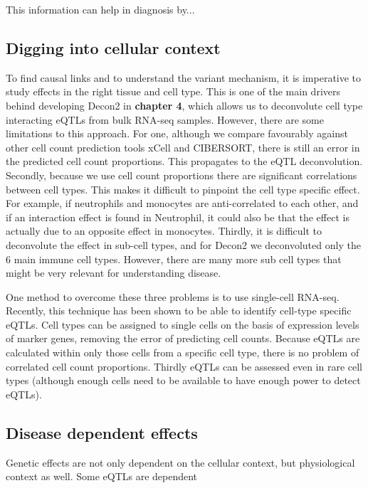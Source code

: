 This information can help in diagnosis by...


\subsection{Digging into cellular context}
To find causal links and to understand the variant mechanism, it is imperative to study effects in the right tissue and cell type. This is one of the main drivers behind developing Decon2 in \textbf{chapter 4}, which allows us to deconvolute cell type interacting eQTLs from bulk RNA-seq samples. However, there are some limitations to this approach. For one, although we compare favourably against other cell count prediction tools xCell\cite{aranXCellDigitallyPortraying2017} and CIBERSORT\cite{newmanRobustEnumerationCell2015}, there is still an error in the predicted cell count proportions. This propagates to the eQTL deconvolution. Secondly, because we use cell count proportions there are significant correlations between cell types. This makes it difficult to pinpoint the cell type specific effect. For example, if neutrophils and monocytes are anti-correlated to each other, and if an interaction effect is found in Neutrophil, it could also be that the effect is actually due to an opposite effect in monocytes. Thirdly, it is difficult to deconvolute the effect in sub-cell types, and for Decon2 we deconvoluted only the 6 main immune cell types. However, there are many more sub cell types that might be very relevant for understanding disease.

One method to overcome these three problems is to use single-cell RNA-seq\cite{tangMRNASeqWholetranscriptomeAnalysis2009}. Recently, this technique has been shown to be able to identify cell-type specific eQTLs\cite{vanderwijstSinglecellRNASequencing2018b}. Cell types can be assigned to single cells on the basis of expression levels of marker genes, removing the error of predicting cell counts. Because eQTLs are calculated within only those cells from a specific cell type, there is no problem of correlated cell count proportions. Thirdly eQTLs can be assessed even in rare cell types (although enough cells need to be available to have enough power to detect eQTLs).

\subsection{Disease dependent effects}
Genetic effects are not only dependent on the cellular context, but physiological context as well. Some eQTLs are dependent 

